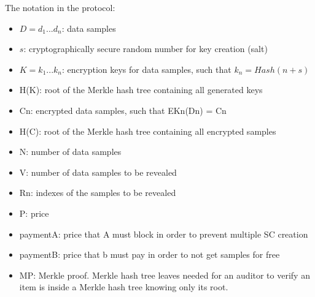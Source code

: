\documentclass[]{article}
\begin{document}
	The notation in the protocol:
	\begin{itemize}
		\item $D = d_1 ... d_n$: data samples
		\item $s$: cryptographically secure random number for key creation (salt)
		\item $K = k_1 ... k_n$: encryption keys for data samples, such that $k_n = Hash(n + s)$
		\item H(K): root of the Merkle hash tree containing all generated keys
		\item Cn: encrypted data samples, such that EKn(Dn) = Cn
		\item H(C): root of the Merkle hash tree containing all encrypted samples
		\item N: number of data samples
		\item V: number of data samples to be revealed
		\item Rn: indexes of the samples to be revealed
		\item P: price
		\item paymentA: price that A must block in order to prevent multiple SC creation
		\item paymentB: price that b must pay in order to not get samples for free
		\item MP: Merkle proof. Merkle hash tree leaves needed for an auditor to verify an item is inside a Merkle hash tree knowing only its root.
	\end{itemize}
\end{document}
